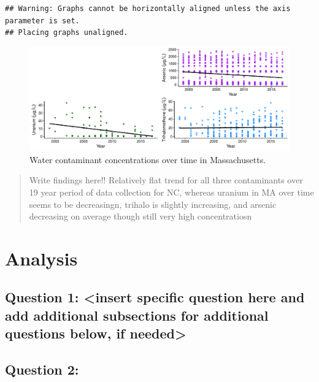 \documentclass[12pt,]{article}
\begin{document}
\begin{verbatim}
## Warning: Graphs cannot be horizontally aligned unless the axis parameter is set.
## Placing graphs unaligned.
\end{verbatim}

\begin{figure}
\centering
\includegraphics{Project_Template_files/figure-latex/figs6-1.pdf}
\caption{Water contaminant concentrations over time in Massachusetts.}
\end{figure}

\begin{quote}
Write findings here!! Relatively flat trend for all three contaminants
over 19 year period of data collection for NC, whereas uranium in MA
over time seems to be decreasingn, trihalo is slightly increasing, and
arsenic decreasing on average though still very high concentratiosn
\end{quote}

\newpage

\hypertarget{analysis}{%
\section{Analysis}\label{analysis}}

\hypertarget{question-1-insert-specific-question-here-and-add-additional-subsections-for-additional-questions-below-if-needed}{%
\subsection{Question 1: \textless{}insert specific question here and add
additional subsections for additional questions below, if
needed\textgreater{}}\label{question-1-insert-specific-question-here-and-add-additional-subsections-for-additional-questions-below-if-needed}}

\hypertarget{question-2}{%
\subsection{Question 2:}\label{question-2}}
\end{document}
